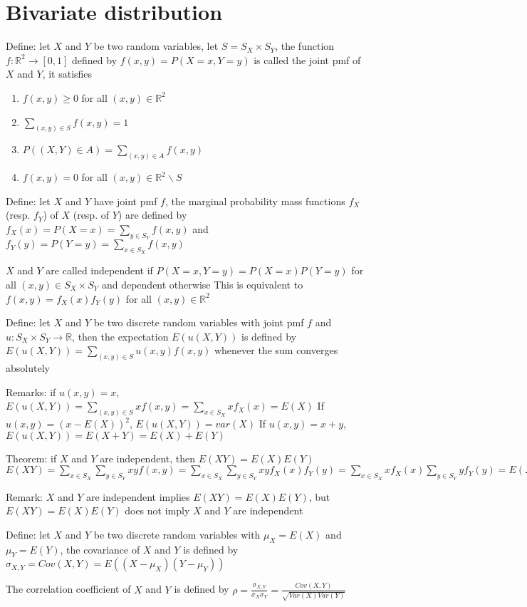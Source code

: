 \documentclass{article}
\begin{document}
\section{Bivariate distribution}

Define: let $X$ and $Y$ be two random variables, let $S=S_X\times S_Y$, the function $f:\mathbb{R}^2\to[0,1]$ defined by $f(x,y)=P(X=x,Y=y)$ is called the joint pmf of $X$ and $Y$, it satisfies
\begin{enumerate}
    \item $f(x,y)\ge0$ for all $(x,y)\in\mathbb{R}^2$
    \item $\sum_{(x,y)\in S}f(x,y)=1$
    \item $P((X,Y)\in A)=\sum_{(x,y)\in A}f(x,y)$
    \item $f(x,y)=0$ for all $(x,y)\in\mathbb{R}^2\backslash S$
\end{enumerate}

Define: let $X$ and $Y$ have joint pmf $f$, the marginal probability mass functions $f_X$ (resp. $f_Y$) of $X$ (resp. of $Y$) are defined by $f_X(x)=P(X=x)=\sum_{y\in S_Y}f(x,y)$ and $f_Y(y)=P(Y=y)=\sum_{x\in S_X}f(x,y)$

$X$ and $Y$ are called independent if $P(X=x,Y=y)=P(X=x)P(Y=y)$ for all $(x,y)\in S_X\times S_Y$ and dependent otherwise
This is equivalent to $f(x,y)=f_X(x)f_Y(y)$ for all $(x,y)\in\mathbb{R}^2$

Define: let $X$ and $Y$ be two discrete random variables with joint pmf $f$ and $u:S_X\times S_Y\to\mathbb{R}$, then the expectation $E(u(X,Y))$ is defined by $E(u(X,Y))=\sum_{(x,y)\in S}u(x,y)f(x,y)$ whenever the sum converges absolutely

Remarks: if $u(x,y)=x$, $E(u(X,Y))=\sum_{(x,y)\in S}xf(x,y)=\sum_{x\in S_X}xf_X(x)=E(X)$
If $u(x,y)=(x-E(X))^2$, $E(u(X,Y))=var(X)$
If $u(x,y)=x+y$, $E(u(X,Y))=E(X+Y)=E(X)+E(Y)$

Theorem: if $X$ and $Y$ are independent, then $E(XY)=E(X)E(Y)$
$E(XY)=\sum_{x\in S_X}\sum_{y\in S_Y}xyf(x,y)=\sum_{x\in S_X}\sum_{y\in S_Y}xyf_X(x)f_Y(y)=\sum_{x\in S_X}xf_X(x)\sum_{y\in S_Y}yf_Y(y)=E(X)E(Y)$

Remark: $X$ and $Y$ are independent implies $E(XY)=E(X)E(Y)$, but $E(XY)=E(X)E(Y)$ does not imply $X$ and $Y$ are independent

Define: let $X$ and $Y$ be two discrete random variables with $\mu_X=E(X)$ and $\mu_Y=E(Y)$, the covariance of $X$ and $Y$ is defined by $\sigma_{X,Y}=Cov(X,Y)=E((X-\mu_X)(Y-\mu_Y))$

The correlation coefficient of $X$ and $Y$ is defined by $\rho=\frac{\sigma_{X,Y}}{\sigma_X\sigma_Y}=\frac{Cov(X,Y)}{\sqrt{Var(X)Var(Y)}}$
\end{document}
